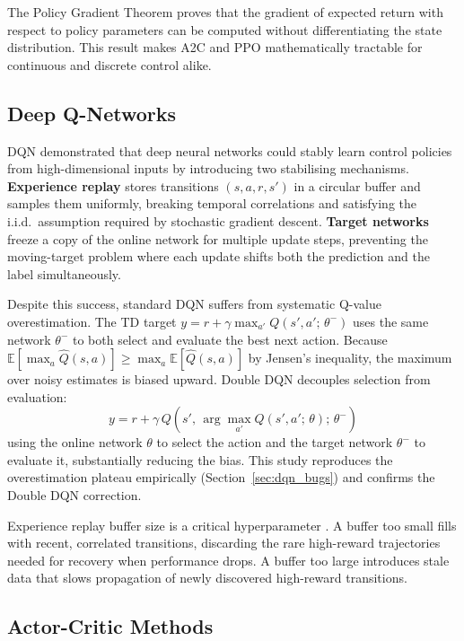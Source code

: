 \documentclass[a4paper,12pt]{article}
\begin{document}
The Policy Gradient Theorem \cite{sutton2018reinforcement} proves that the gradient of expected return with respect to policy parameters can be computed without differentiating the state distribution. This result makes A2C and PPO mathematically tractable for continuous and discrete control alike.

\subsection{Deep Q-Networks}

DQN \cite{mnih2015human} demonstrated that deep neural networks could stably learn control policies from high-dimensional inputs by introducing two stabilising mechanisms. \textbf{Experience replay} stores transitions $(s, a, r, s')$ in a circular buffer and samples them uniformly, breaking temporal correlations and satisfying the i.i.d.\ assumption required by stochastic gradient descent. \textbf{Target networks} freeze a copy of the online network for multiple update steps, preventing the moving-target problem where each update shifts both the prediction and the label simultaneously.

Despite this success, standard DQN suffers from systematic Q-value overestimation. The TD target
$y = r + \gamma \max_{a'} Q(s', a';\, \theta^-)$
uses the same network $\theta^-$ to both select and evaluate the best next action. Because $\mathbb{E}[\max_a \hat{Q}(s,a)] \geq \max_a \mathbb{E}[\hat{Q}(s,a)]$ by Jensen's inequality, the maximum over noisy estimates is biased upward. Double DQN \cite{van2016deep} decouples selection from evaluation:
\begin{equation}
  y = r + \gamma\, Q\!\left(s',\, \arg\max_{a'} Q(s', a';\, \theta);\, \theta^-\right)
\end{equation}
using the online network $\theta$ to select the action and the target network $\theta^-$ to evaluate it, substantially reducing the bias. This study reproduces the overestimation plateau empirically (Section~\ref{sec:dqn_bugs}) and confirms the Double DQN correction.

Experience replay buffer size is a critical hyperparameter \cite{zhang2019deeper}. A buffer too small fills with recent, correlated transitions, discarding the rare high-reward trajectories needed for recovery when performance drops. A buffer too large introduces stale data that slows propagation of newly discovered high-reward transitions.

\subsection{Actor-Critic Methods}
\end{document}
